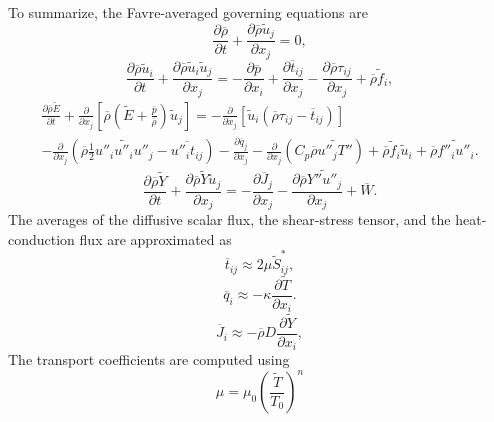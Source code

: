 \documentclass[oneside,a4paper,11pt]{report}
\newcommand{\rhoavg}{\overline{\rho}}
\newcommand{\pavg}{\overline{p}}
\newcommand{\qavg}{\overline{q}}
\newcommand{\tavg}{\overline{t}}
\newcommand{\Javg}{\overline{J}}
\newcommand{\Wavg}{\overline{W}}
\newcommand{\rs}{\tau}          %
\newcommand{\favgf}{\widetilde{f}}
\newcommand{\uavgf}{\widetilde{u}}
\newcommand{\Eavgf}{\widetilde{E}}
\newcommand{\Tavgf}{\widetilde{T}}
\newcommand{\Yavgf}{\widetilde{Y}}
\newcommand{\Savgf}{\widetilde{S}}
\newcommand{\fflucf}{f''}
\newcommand{\Yflucf}{Y''}
\newcommand{\Tflucf}{T''}
\newcommand{\uflucf}{u''}
\begin{document}
To summarize, the Favre-averaged governing equations are
\begin{equation}
\label{eq:favre_rho}
\frac{\partial \rhoavg}{\partial t} + \frac{\partial \rhoavg \uavgf_j}{\partial x_j} = 0,
\end{equation}
\begin{equation}
\label{eq:favre_vel}
\frac{\partial \rhoavg \uavgf_i}{\partial t} + \frac{\partial \rhoavg \uavgf_i \uavgf_j}{\partial x_j} = -\frac{\partial \pavg}{\partial x_i} + \frac{\partial \tavg_{ij}}{\partial x_j} - \frac{\partial \rhoavg \rs_{ij} }{\partial x_j} + \rhoavg \favgf_i,
\end{equation}
\begin{multline}
\label{eq:favre_energy}
\frac{\partial \rhoavg \Eavgf}{\partial t} + \frac{\partial}{\partial x_j} \left [ \rhoavg \left ( \Eavgf + \frac{ \pavg}{ \rhoavg} \right ) \uavgf_j \right ] = - \frac{\partial}{\partial x_j} \left [ \uavgf_i \left ( \rhoavg \rs_{ij} - \tavg_{ij} \right ) \right ] \\
- \frac{ \partial }{\partial x_j} \left ( \rhoavg \frac{1}{2} \widetilde{ \uflucf_i \uflucf_i \uflucf_j } - \overline{ \uflucf_i t_{ij} } \right ) - \frac{\partial \qavg_j}{\partial x_j} - \frac{\partial}{\partial x_j} \left ( C_p \rhoavg \widetilde{ \uflucf_j \Tflucf } \right ) + \rhoavg \favgf_i \uavgf_i + \rhoavg \widetilde{ \fflucf_i \uflucf_i }.
\end{multline}
\begin{equation}
    \label{eq:favre_scalar}
    \frac{\partial \rhoavg \Yavgf}{\partial t} + \frac{\partial \rhoavg \Yavgf \uavgf_j}{\partial x_j} = -\frac{\partial \Javg_j}{\partial x_j} - \frac{\partial \rhoavg \widetilde{\Yflucf \uflucf_j}}{\partial x_j} + \Wavg.    
\end{equation}
The averages of the diffusive scalar flux, the shear-stress tensor, and the heat-conduction flux are approximated as
\begin{equation}
    \label{eq:shear_stress_model}
    \tavg_{ij} \approx 2 \mu \Savgf^*_{ij},
\end{equation}
\begin{equation}
    \qavg_i \approx -\kappa \frac{ \partial \Tavgf }{ \partial x_i }.
\end{equation}
\begin{equation}
    \Javg_i \approx - \rhoavg D \frac{\partial \Yavgf}{\partial x_i},
\end{equation}
The transport coefficients are computed using
\begin{equation}
    \mu = \mu_0 \left ( \frac{\Tavgf}{T_0} \right )^n
\end{equation}
\end{document}
